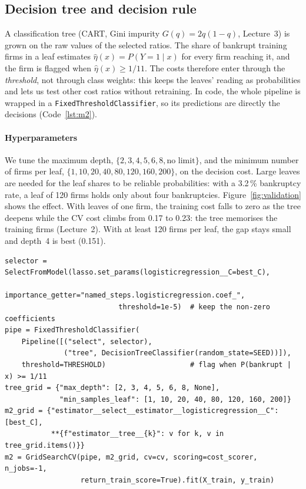 \documentclass[11pt,a4paper]{article}
\begin{document}
\subsection{Decision tree and decision rule}
A classification tree (CART, Gini impurity $G(q) = 2q(1-q)$, Lecture~3) is grown on the raw values of the selected ratios. The share of bankrupt training firms in a leaf estimates $\hat\eta(x) = P(Y=1 \mid x)$ for every firm reaching it, and the firm is flagged when $\hat\eta(x) \ge 1/11$. The costs therefore enter through the \emph{threshold}, not through class weights: this keeps the leaves' reading as probabilities and lets us test other cost ratios without retraining. In code, the whole pipeline is wrapped in a \texttt{FixedThresholdClassifier}, so its predictions are directly the decisions (Code~\ref{lst:m2}).

\paragraph{Hyperparameters} We tune the maximum depth, $\{2,3,4,5,6,8,\text{no limit}\}$, and the minimum number of firms per leaf, $\{1,10,20,40,80,120,160,200\}$, on the decision cost. Large leaves are needed for the leaf shares to be reliable probabilities: with a 3.2\,\% bankruptcy rate, a leaf of 120 firms holds only about four bankruptcies. Figure~\ref{fig:validation} shows the effect. With leaves of one firm, the training cost falls to zero as the tree deepens while the CV cost climbs from 0.17 to 0.23: the tree memorises the training firms (Lecture~2). With at least 120 firms per leaf, the gap stays small and depth~4 is best (0.151).

\begin{lstlisting}[float=htbp, caption={Final pipeline M2 and its tuning (notebook, Sections 2.4 and 3.3).}, label={lst:m2}]
selector = SelectFromModel(lasso.set_params(logisticregression__C=best_C),
                           importance_getter="named_steps.logisticregression.coef_",
                           threshold=1e-5)  # keep the non-zero coefficients
pipe = FixedThresholdClassifier(
    Pipeline([("select", selector),
              ("tree", DecisionTreeClassifier(random_state=SEED))]),
    threshold=THRESHOLD)                    # flag when P(bankrupt | x) >= 1/11
tree_grid = {"max_depth": [2, 3, 4, 5, 6, 8, None],
             "min_samples_leaf": [1, 10, 20, 40, 80, 120, 160, 200]}
m2_grid = {"estimator__select__estimator__logisticregression__C": [best_C],
           **{f"estimator__tree__{k}": v for k, v in tree_grid.items()}}
m2 = GridSearchCV(pipe, m2_grid, cv=cv, scoring=cost_scorer, n_jobs=-1,
                  return_train_score=True).fit(X_train, y_train)
\end{lstlisting}
\end{document}

